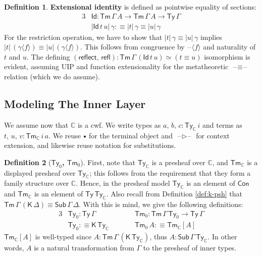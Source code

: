 \documentclass[12pt,a4paper,twoside,openany]{book}
\theoremstyle{remark}
\theoremstyle{definition}
\newtheorem{mydefinition}{Definition}
\theoremstyle{theorem}
\newcommand{\mbb}[1]{\mathbb{#1}}
\newcommand{\refl}{\mathsf{refl}}
\newcommand{\reflect}{\mathsf{reflect}}
\newcommand{\Con}{\mathsf{Con}}
\newcommand{\Sub}{\mathsf{Sub}}
\newcommand{\Tm}{\mathsf{Tm}}
\newcommand{\Ty}{\mathsf{Ty}}
\newcommand{\Id}{\mathsf{Id}}
\newcommand{\blank}{\mathord{\hspace{1pt}\text{--}\hspace{1pt}}}
\newcommand{\ext}{\triangleright}
\newcommand{\emptycon}{\scaleobj{.75}\bullet}
\newcommand{\K}{\mathsf{K}}
\newcommand{\mbbC}{\mbb{C}}
\newcommand{\lab}{\langle}
\newcommand{\rab}{\rangle}
\newcommand{\defn}{:\equiv}
\begin{document}
\begin{mydefinition}
\textbf{Extensional identity} is defined as pointwise equality of sections:
\begin{alignat*}{3}
  & \Id : \Tm\,\Gamma\,A \to \Tm\,\Gamma\,A \to \Ty\,\Gamma\\
  & |\Id\,t\,u|\,\gamma \defn |t|\,\gamma \equiv |u|\,\gamma
\end{alignat*}
For the restriction operation, we have to show that $|t|\,\gamma \equiv |u|\,\gamma$
implies $|t|\,(\gamma\lab f \rab) \equiv |u|\,(\gamma \lab f \rab)$. This
follows from congruence by $\blank \lab f \rab$ and naturality of $t$ and
$u$.  The defining $(\reflect,\,\refl) : \Tm\,\Gamma\,(\Id\,t\,u) \simeq (t \equiv
u)$ isomorphism is evident, assuming UIP and function extensionality for the
metatheoretic $\blank\!\equiv\!\blank$ relation (which we do assume).
\end{mydefinition}

\subsection{Modeling The Inner Layer}

We assume now that $\mbbC$ is a cwf. We write types as $a,\,b,\,c :
\Ty_\mbbC\,i$ and terms as $t,\,u,\,v : \Tm_\mbbC\,i\,a$. We reuse $\emptycon$
for the terminal object and $\blank\ext\blank$ for context extension, and
likewise reuse notation for substitutions.

\begin{mydefinition}[\textbf{$\Ty_{0}$, $\Tm_{0}$}]
First, note that $\Ty_{\mbbC}$ is a presheaf over $\mbbC$, and $\Tm_{\mbbC}$ is
a displayed presheaf over $\Ty_{\mbbC}$; this follows from the requirement that
they form a family structure over $\mbbC$. Hence, in the presheaf model
$\Ty_{\mbbC}$ is an element of $\Con$ and $\Tm_{\mbbC}$ is an element of
$\Ty\,\Ty_{\mbbC}$. Also recall from Definition \ref{def:k-psh} that
$\Tm\,\Gamma\,(\K\,\Delta) \equiv \Sub\,\Gamma\,\Delta$. With this is mind, we
give the following definitions:
\begin{alignat*}{3}
  & \Ty_0 : \Ty\,\Gamma                   && \Tm_0 : \Tm\,\Gamma\,\Ty_0 \to \Ty\,\Gamma\\
  & \Ty_0 \defn \K\,\Ty_{\mbbC}\hspace{2em} && \Tm_0\,A \defn \Tm_{\mbbC}[A]
\end{alignat*}
$\Tm_{\mbbC}[A]$ is well-typed since $A : \Tm\,\Gamma\,(\K\,\Ty_{\mbbC})$, thus
$A : \Sub\,\Gamma\,\Ty_{\mbbC}$. In other words, $A$ is a natural transformation
from $\Gamma$ to the presheaf of inner types.
\end{mydefinition}
\end{document}
